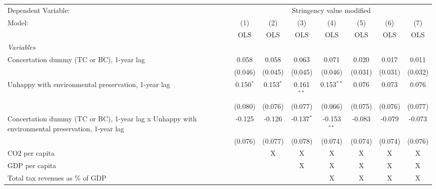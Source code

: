 
\begingroup
\centering
\begin{tabular}{lccccccc}
   \toprule
   Dependent Variable: & \multicolumn{7}{c}{Stringency value modified}\\
   Model:                                                                                          & (1)         & (2)         & (3)          & (4)           & (5)     & (6)     & (7)\\  
                                                                                                   &  OLS        & OLS         & OLS          & OLS           & OLS     & OLS     & OLS\\  
   \midrule
   \emph{Variables}\\
   Concertation dummy (TC or BC), 1-year lag                                                       & 0.058       & 0.058       & 0.063        & 0.071         & 0.020   & 0.017   & 0.011\\   
                                                                                                   & (0.046)     & (0.045)     & (0.045)      & (0.046)       & (0.031) & (0.031) & (0.032)\\   
   Unhappy with environmental preservation, 1-year lag                                             & 0.150$^{*}$ & 0.153$^{*}$ & 0.161$^{**}$ & 0.153$^{**}$  & 0.076   & 0.073   & 0.076\\   
                                                                                                   & (0.080)     & (0.076)     & (0.077)      & (0.066)       & (0.075) & (0.076) & (0.077)\\   
   Concertation dummy (TC or BC), 1-year lag x Unhappy with environmental preservation, 1-year lag & -0.125      & -0.126      & -0.137$^{*}$ & -0.153$^{**}$ & -0.083  & -0.079  & -0.073\\   
                                                                                                   & (0.076)     & (0.077)     & (0.078)      & (0.074)       & (0.074) & (0.074) & (0.076)\\   
   CO2 per capita                                                                                  &             & X           & X            & X             & X       & X       & X\\  
   GDP per capita                                                                                  &             &             & X            & X             & X       & X       & X\\  
   Total tax revenues as \% of GDP                                                                 &             &             &              & X             & X       & X       & X\\  

\end{tabular}
